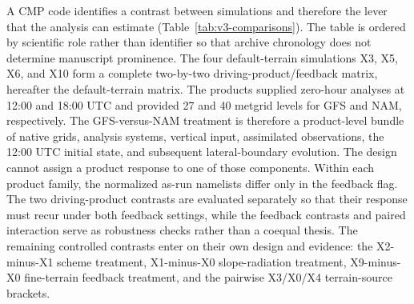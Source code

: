 \documentclass[air,article,submit,moreauthors]{Definitions/mdpi}
\begin{document}
A CMP code identifies a contrast between simulations and therefore the lever that the analysis can estimate (Table~\ref{tab:v3-comparisons}).
The table is ordered by scientific role rather than identifier so that archive chronology does not determine manuscript prominence.
The four default-terrain simulations X3, X5, X6, and X10 form a complete two-by-two driving-product/feedback matrix, hereafter the default-terrain matrix.
The products supplied zero-hour analyses at 12:00 and 18:00 UTC and provided 27 and 40 metgrid levels for GFS and NAM, respectively.
The GFS-versus-NAM treatment is therefore a product-level bundle of native grids, analysis systems, vertical input, assimilated observations, the 12:00 UTC initial state, and subsequent lateral-boundary evolution.
The design cannot assign a product response to one of those components.
Within each product family, the normalized as-run namelists differ only in the feedback flag.
The two driving-product contrasts are evaluated separately so that their response must recur under both feedback settings, while the feedback contrasts and paired interaction serve as robustness checks rather than a coequal thesis.
The remaining controlled contrasts enter on their own design and evidence: the X2-minus-X1 scheme treatment, X1-minus-X0 slope-radiation treatment, X9-minus-X0 fine-terrain feedback treatment, and the pairwise X3/X0/X4 terrain-source brackets.
\end{document}
